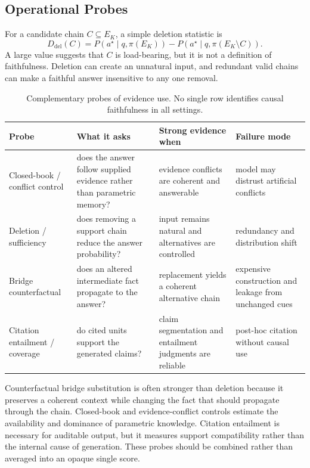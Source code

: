 \documentclass[manuscript,review]{acmart}
\theoremstyle{definition}
\theoremstyle{plain}
\theoremstyle{remark}
\begin{document}
\subsection{Operational Probes}
\label{subsec:faithfulness_probes}

For a candidate chain $C\subseteq E_K$, a simple deletion statistic is
\begin{equation}
D_{\mathrm{del}}(C)=
P(a^\star\mid q,\pi(E_K))-P(a^\star\mid q,\pi(E_K\setminus C)).
\end{equation}
A large value suggests that $C$ is load-bearing, but it is not a definition of
faithfulness. Deletion can create an unnatural input, and redundant valid
chains can make a faithful answer insensitive to any one removal.

\begin{table}[t]
\caption{Complementary probes of evidence use. No single row identifies
causal faithfulness in all settings.}
\label{tab:faithfulness_probes}
\centering
\scriptsize
\begin{tabularx}{\linewidth}{@{}p{2.4cm}p{2.8cm}p{2.7cm}Y@{}}
\toprule
Probe & What it asks & Strong evidence when & Failure mode \\
\midrule
Closed-book / conflict control & does the answer follow supplied evidence rather than parametric memory? & evidence conflicts are coherent and answerable & model may distrust artificial conflicts \\
Deletion / sufficiency & does removing a support chain reduce the answer probability? & input remains natural and alternatives are controlled & redundancy and distribution shift \\
Bridge counterfactual & does an altered intermediate fact propagate to the answer? & replacement yields a coherent alternative chain & expensive construction and leakage from unchanged cues \\
Citation entailment / coverage & do cited units support the generated claims? & claim segmentation and entailment judgments are reliable & post-hoc citation without causal use \\
\bottomrule
\end{tabularx}
\end{table}

Counterfactual bridge substitution is often stronger than deletion because it
preserves a coherent context while changing the fact that should propagate
through the chain. Closed-book and evidence-conflict controls estimate the
availability and dominance of parametric knowledge. Citation entailment is
necessary for auditable output, but it measures support compatibility rather
than the internal cause of generation. These probes should be combined rather
than averaged into an opaque single score.
\end{document}
